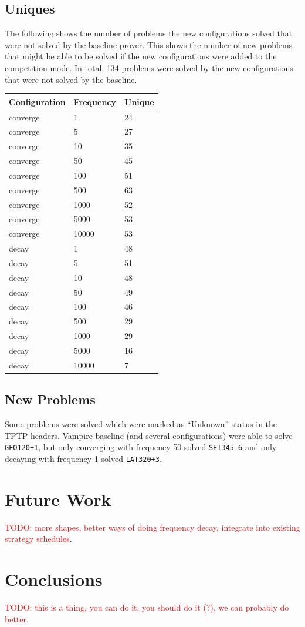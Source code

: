 \documentclass{llncs}
\newcommand{\todo}[1]{\textcolor{red}{TODO: #1}}
\begin{document}
\subsection{Uniques}
The following shows the number of problems the new configurations solved that were not solved by the baseline prover.
This shows the number of new problems that might be able to be solved if the new configurations were added to the competition mode.
In total, 134 problems were solved by the new configurations that were not solved by the baseline.

\begin{center}
\begin{tabular}{l l l}
	Configuration & Frequency & Unique\\
	\hline
	converge & 1 & 24\\
	converge & 5 & 27\\
	converge & 10 & 35\\
	converge & 50 & 45\\
	converge & 100 & 51\\
	converge & 500 & 63\\
	converge & 1000 & 52\\
	converge & 5000 & 53\\
	converge & 10000 & 53\\
	\hline
	decay & 1 & 48\\
	decay & 5 & 51\\
	decay & 10 & 48\\
	decay & 50 & 49\\
	decay & 100 & 46\\
	decay & 500 & 29\\
	decay & 1000 & 29\\
	decay & 5000 & 16\\
	decay & 10000 & 7\\
\end{tabular}
\end{center}

\subsection{New Problems}
Some problems were solved which were marked as ``Unknown'' status in the TPTP headers.
Vampire baseline (and several configurations) were able to solve \texttt{GEO120+1}, but only converging with frequency 50 solved \texttt{SET345-6} and only decaying with frequency 1 solved \texttt{LAT320+3}.

\section{Future Work}
\todo{more shapes, better ways of doing frequency decay, integrate into existing strategy schedules}.

\section{Conclusions}
\todo{this is a thing, you can do it, you should do it (?), we can probably do better}.



\end{document}
